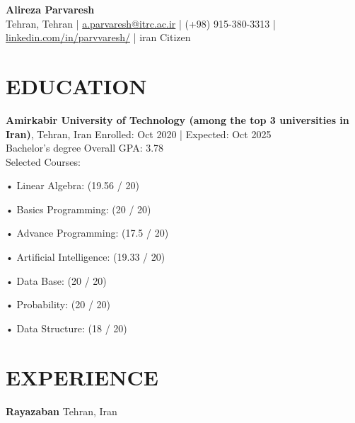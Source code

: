 \documentclass[a4paper,9pt]{extarticle}
\begin{document}
\pagestyle{empty}

\begin{center}
\textbf{\Large Alireza Parvaresh}\\[2pt] %
Tehran, Tehran | \href{mailto:example@example.com}{a.parvaresh@itrc.ac.ir} | (+98) 915-380-3313 | \href{https://www.linkedin.com/in/johndoe}{linkedin.com/in/parvvaresh/} | iran Citizen %
\end{center}

\section*{EDUCATION}
\noindent
\textbf{Amirkabir University of Technology (among the top 3 universities in Iran)}, Tehran, Iran \hfill Enrolled: Oct 2020 | Expected: Oct 2025\\ %
Bachelor's degree \hfill Overall GPA: 3.78\\ %
Selected Courses: 
\begin{itemize} • Linear  Algebra: (19.56 / 20) \end{itemize}
\begin{itemize} • Basics  Programming: (20 / 20) \end{itemize}
\begin{itemize} • Advance  Programming: (17.5 / 20) \end{itemize}
\begin{itemize} • Artificial Intelligence: (19.33 / 20) \end{itemize}
\begin{itemize} • Data Base: (20 / 20) 
\end{itemize}
\begin{itemize} • Probability: (20 / 20) \end{itemize}
\begin{itemize} • Data Structure: (18 / 20) \end{itemize}



\section*{EXPERIENCE}

\noindent

\textbf{Rayazaban} \hfill Tehran, Iran\\ %
\end{document}
